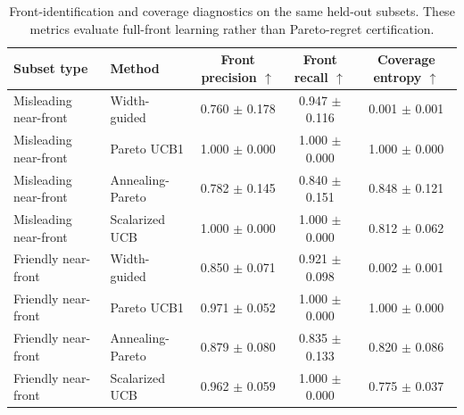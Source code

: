 \begin{table}[t]
\centering
\caption{Front-identification and coverage diagnostics on the same held-out subsets. These metrics evaluate full-front learning rather than Pareto-regret certification.}
\label{tab:real-front-coverage}
\scriptsize
\begin{tabular}{llccc}
\toprule
Subset type & Method & Front precision $\uparrow$ & Front recall $\uparrow$ & Coverage entropy $\uparrow$ \\
\midrule
Misleading near-front & Width-guided & 0.760 $\pm$ 0.178 & 0.947 $\pm$ 0.116 & 0.001 $\pm$ 0.001 \\
Misleading near-front & Pareto UCB1 & 1.000 $\pm$ 0.000 & 1.000 $\pm$ 0.000 & 1.000 $\pm$ 0.000 \\
Misleading near-front & Annealing-Pareto & 0.782 $\pm$ 0.145 & 0.840 $\pm$ 0.151 & 0.848 $\pm$ 0.121 \\
Misleading near-front & Scalarized UCB & 1.000 $\pm$ 0.000 & 1.000 $\pm$ 0.000 & 0.812 $\pm$ 0.062 \\
\midrule
Friendly near-front & Width-guided & 0.850 $\pm$ 0.071 & 0.921 $\pm$ 0.098 & 0.002 $\pm$ 0.001 \\
Friendly near-front & Pareto UCB1 & 0.971 $\pm$ 0.052 & 1.000 $\pm$ 0.000 & 1.000 $\pm$ 0.000 \\
Friendly near-front & Annealing-Pareto & 0.879 $\pm$ 0.080 & 0.835 $\pm$ 0.133 & 0.820 $\pm$ 0.086 \\
Friendly near-front & Scalarized UCB & 0.962 $\pm$ 0.059 & 1.000 $\pm$ 0.000 & 0.775 $\pm$ 0.037 \\
\bottomrule
\end{tabular}
\end{table}
